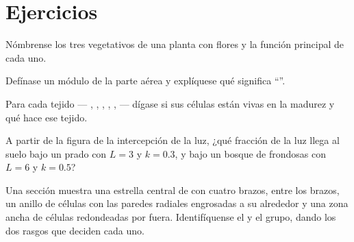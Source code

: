 \section{Ejercicios}

\begin{exercise}[$\star$]\label{exo:b1:flowering-plant-organization:1}
Nómbrense los tres  vegetativos de una planta con flores y la función
principal de cada uno.
\end{exercise}

\begin{exercise}[$\star$]\label{exo:b1:flowering-plant-organization:2}
Defínase un módulo de la parte aérea y explíquese qué significa
``''.
\end{exercise}

\begin{exercise}[$\star$]\label{exo:b1:flowering-plant-organization:3}
Para cada tejido --- , , , ,
,  --- dígase si sus células están vivas en la madurez y qué
hace ese tejido.
\end{exercise}

\begin{exercise}[$\star$]\label{exo:b1:flowering-plant-organization:4}
A partir de la figura de la intercepción de la luz, ¿qué fracción de la luz
llega al suelo bajo un prado con $L = 3$ y $k = 0.3$, y bajo un bosque de
frondosas con $L = 6$ y $k = 0.5$?
\end{exercise}

\begin{exercise}[$\star\star$]\label{exo:b1:flowering-plant-organization:5}
Una sección muestra una estrella central de  con cuatro brazos, 
entre los brazos, un anillo de células con las paredes radiales engrosadas a
su alrededor y una zona ancha de células redondeadas por fuera.
Identifíquense el  y el grupo, dando los dos rasgos que deciden cada
uno.
\end{exercise}

